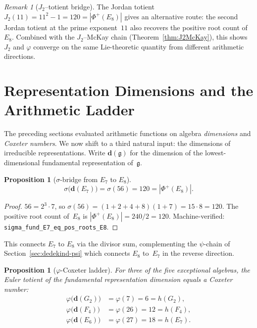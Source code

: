 \documentclass[11pt]{amsart}
\theoremstyle{plain}
\newtheorem{proposition}[theorem]{Proposition}
\theoremstyle{definition}
\theoremstyle{remark}
\newtheorem{remark}[theorem]{Remark}
\newcommand{\fg}{\mathfrak{g}}
\renewcommand{\Phi}{\varPhi}
\begin{document}
\begin{remark}[$J_2$--totient bridge]\label{rem:J2-totient-bridge}
The Jordan totient $J_2(11) = 11^2 - 1 = 120 = |\Phi^+(E_8)|$
gives an alternative route: the second Jordan totient at the prime
exponent~$11$ also recovers the positive root count of~$E_8$.
Combined with the $J_2$--McKay chain
(Theorem~\ref{thm:J2McKay}), this shows $J_2$ and $\varphi$
converge on the same Lie-theoretic quantity from different
arithmetic directions.
\end{remark}

\section{Representation Dimensions and the Arithmetic Ladder}
\label{sec:rep-dims}

The preceding sections evaluated arithmetic functions on algebra
\emph{dimensions} and \emph{Coxeter numbers}.  We now shift to a third
natural input: the dimensions of irreducible representations.  Write
$\mathbf{d}(\fg)$ for the dimension of the lowest-dimensional fundamental
representation of~$\fg$.

\begin{proposition}[$\sigma$-bridge from $E_7$ to $E_8$]
\label{prop:sigma-fund-E7}
\[
  \sigma\bigl(\mathbf{d}(E_7)\bigr)
  = \sigma(56) = 120 = |\Phi^+(E_8)|.
\]
\end{proposition}

\begin{proof}
$56 = 2^3 \cdot 7$, so
$\sigma(56) = (1+2+4+8)(1+7) = 15 \cdot 8 = 120$.
The positive root count of~$E_8$ is $|\Phi^+(E_8)| = 240/2 = 120$.
Machine-verified: \texttt{sigma\_fund\_E7\_eq\_pos\_roots\_E8}.
\end{proof}

This connects $E_7$ to $E_8$ via the divisor sum, complementing the
$\psi$-chain of Section~\ref{sec:dedekind-psi} which connects $E_8$
to~$E_7$ in the reverse direction.

\begin{proposition}[$\varphi$-Coxeter ladder]\label{prop:phi-coxeter}
For three of the five exceptional algebras, the Euler totient of the
fundamental representation dimension equals a Coxeter number:
\begin{align*}
  \varphi\bigl(\mathbf{d}(G_2)\bigr) &= \varphi(7) = 6 = h(G_2), \\
  \varphi\bigl(\mathbf{d}(F_4)\bigr) &= \varphi(26) = 12 = h(F_4), \\
  \varphi\bigl(\mathbf{d}(E_6)\bigr) &= \varphi(27) = 18 = h(E_7).
\end{align*}
\end{proposition}
\end{document}
